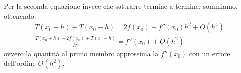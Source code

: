Per la seconda equazione invece che sottrarre termine a termine, sommiamo,
ottenendo:
\begin{equation*}
	\begin{split}
		T(x_{0}+h) + T(x_{0}-h) = 2f(x_{0}) + f''(x_{0})h^{2} + O(h^{4})\\
		\frac{T(x_{0}+h) - 2f(x_{0}) + T(x_{0}-h)}{h^{2}} = f''(x_{0}) + O(h^{2}) 
	\end{split}
\end{equation*}
ovvero la quantit\`a al primo membro approssima la $f''(x_{0})$ con un errore 
dell'ordine $O(h^{2})$.
